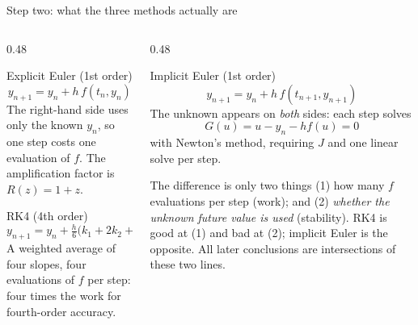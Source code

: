 \documentclass[aspectratio=169,10pt]{beamer}
\begin{document}
\begin{frame}{Step two: what the three methods actually are}
  \begin{columns}[T]
    \begin{column}{0.48\textwidth}
      \begin{block}{Explicit Euler (1st order)}
        \footnotesize
        \[
          y_{n+1}=y_n+h\,f(t_n,y_n)
        \]
        The right-hand side uses only the known $y_n$, so one step costs
        one evaluation of $f$.  The amplification factor is $R(z)=1+z$.
      \end{block}
      \begin{block}{RK4 (4th order)}
        \footnotesize
        \[
          y_{n+1}=y_n+\tfrac{h}{6}\bigl(k_1+2k_2+2k_3+k_4\bigr)
        \]
        A weighted average of four slopes, four evaluations of $f$ per step:
        \alert{four times the work for fourth-order accuracy}.
      \end{block}
    \end{column}
    \begin{column}{0.48\textwidth}
      \begin{block}{Implicit Euler (1st order)}
        \footnotesize
        \[
          y_{n+1}=y_n+h\,f(t_{n+1},y_{n+1})
        \]
        The unknown appears on \emph{both} sides: each step solves
        \[
          G(u)=u-y_n-hf(u)=0
        \]
        with Newton's method, requiring $J$ and one linear solve per step.
      \end{block}
      \begin{alertblock}{The difference is only two things}
        \footnotesize
        (1) how many $f$ evaluations per step (work); and
        (2) \emph{whether the unknown future value is used} (stability).
        RK4 is good at (1) and bad at (2); implicit Euler is the opposite.
        All later conclusions are intersections of these two lines.
      \end{alertblock}
    \end{column}
  \end{columns}
\end{frame}
\end{document}
